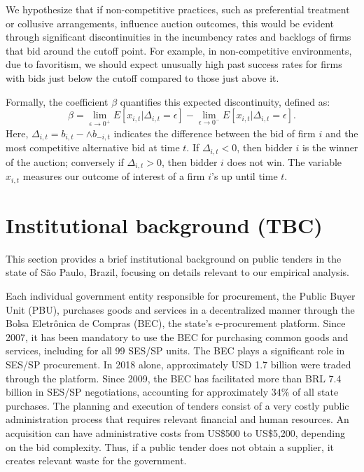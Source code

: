 \documentclass[12 pt]{elsarticle}
\begin{document}
We hypothesize that if non-competitive practices, such as preferential treatment or collusive arrangements, influence auction outcomes, this would be evident through significant discontinuities in the incumbency rates and backlogs of firms that bid around the cutoff point. For example, in non-competitive environments, due to favoritism, we should expect unusually high past success rates for firms with bids just below the cutoff compared to those just above it.

Formally, the coefficient \(\beta\) quantifies this expected discontinuity, defined as:
\[
\beta = \lim_{\epsilon \to 0^+} E[x_{i,t} | \Delta_{i,t} = \epsilon] - \lim_{\epsilon \to 0^-} E[x_{i,t} | \Delta_{i,t} = \epsilon].
\]
Here, \(\Delta_{i,t} = b_{i,t} - \land b_{-i,t}\) indicates the difference between the bid of firm \(i\) and the most competitive alternative bid at time \(t\). If \(\Delta_{i,t} < 0\), then bidder \(i\) is the winner of the auction; conversely if \(\Delta_{i,t} > 0\), then bidder \(i\) does not win. The variable \(x_{i,t}\) measures our outcome of interest of a firm \(i\)'s up until time \(t\).

\section{Institutional background (TBC)} \label{hist}

This section provides a brief institutional background on public tenders in the state of São Paulo, Brazil, focusing on details relevant to our empirical analysis.

Each individual government entity responsible for procurement, the Public Buyer Unit (PBU), purchases goods and services in a decentralized manner through the Bolsa Eletrônica de Compras (BEC), the state's e-procurement platform. Since 2007, it has been mandatory to use the BEC for purchasing common goods and services, including for all 99 SES/SP units. The BEC plays a significant role in SES/SP procurement. In 2018 alone, approximately USD 1.7 billion were traded through the platform. Since 2009, the BEC has facilitated more than BRL 7.4 billion in SES/SP negotiations, accounting for approximately 34\% of all state purchases. The planning and execution of tenders consist of a very costly public administration process that requires relevant financial and human resources. An acquisition can have administrative costs from US\$500 to US\$5,200, depending on the bid complexity. Thus, if a public tender does not obtain a supplier, it creates relevant waste for the government.
\end{document}

